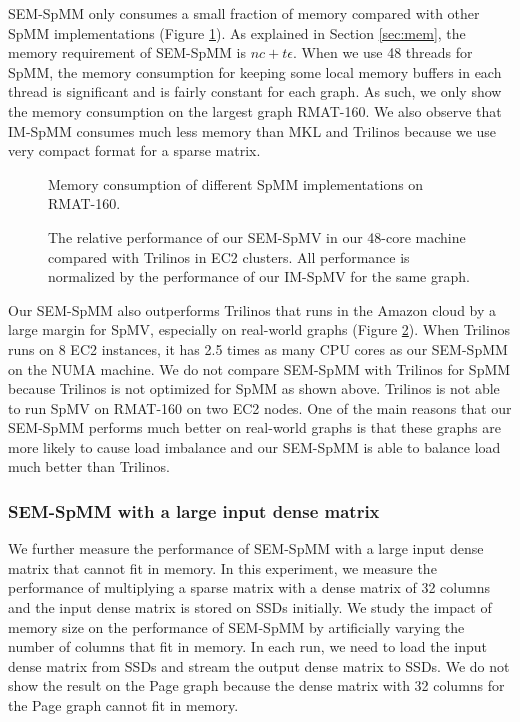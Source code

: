 SEM-SpMM only consumes a small fraction of memory compared with other SpMM
implementations (Figure \ref{perf:spmm_mem}). As explained in Section
\ref{sec:mem}, the memory requirement of SEM-SpMM is $n c + t \epsilon$.
When we use 48 threads for SpMM, the memory consumption for keeping some
local memory buffers in each thread is significant and is fairly constant
for each graph. As such, we only show the memory consumption on the largest
graph RMAT-160. We also observe that IM-SpMM consumes much less memory than
MKL and Trilinos because we use very compact format for a sparse matrix.

\begin{figure}
	\begin{center}
		\footnotesize
		
		\caption{Memory consumption of different SpMM implementations on
		RMAT-160.}
		\label{perf:spmm_mem}
	\end{center}
\end{figure}

\begin{figure}
	\begin{center}
		\footnotesize
		
		\caption{The relative performance of our SEM-SpMV in our 48-core
			machine compared with Trilinos in EC2 clusters. All performance
			is normalized by the performance of our IM-SpMV for the same
			graph.}
		\label{perf:ec2}
	\end{center}
\end{figure}

Our SEM-SpMM also outperforms Trilinos that runs in the Amazon cloud by a large
margin for SpMV, especially on real-world graphs (Figure \ref{perf:ec2}).
When Trilinos runs on 8 EC2 instances, it has 2.5 times as many CPU cores as
our SEM-SpMM on the NUMA machine. We do not compare SEM-SpMM with Trilinos
for SpMM because Trilinos is not optimized for SpMM as shown above. Trilinos
is not able to run SpMV on RMAT-160 on two EC2 nodes.
One of the main reasons that our SEM-SpMM performs much
better on real-world graphs is that these graphs are more likely to cause
load imbalance and our SEM-SpMM is able to balance load much better than
Trilinos.

\subsubsection{SEM-SpMM with a large input dense matrix}

We further measure the performance of SEM-SpMM with a large input dense matrix
that cannot fit in memory. In this experiment, we measure the performance of
multiplying a sparse matrix with a dense matrix of 32 columns and the input
dense matrix is stored on SSDs initially. We study the impact of memory size
on the performance of SEM-SpMM by artificially varying the number of columns
that fit in memory. In each run, we need to load the input dense matrix from
SSDs and stream the output dense matrix to SSDs. We do not show the result on
the Page graph because the dense matrix with 32 columns for the Page graph
cannot fit in memory.

